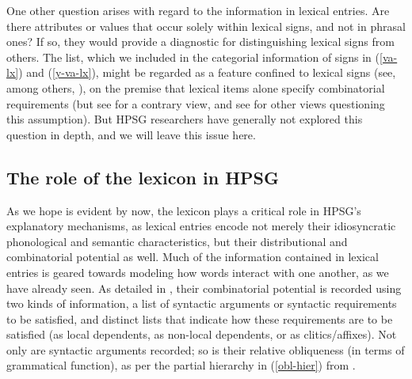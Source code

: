 \documentclass[output=paper,biblatex,babelshorthands,newtxmath,draftmode,colorlinks,citecolor=brown]{langscibook}
\begin{document}
\largerpage
One other question arises with regard to the information in lexical entries.
Are there attributes or values that occur solely within lexical signs, and not in phrasal ones? 
If so, they would provide a diagnostic for distinguishing lexical signs from others.
The  list, which we included in the categorial information of signs in (\ref{va-lx}) and (\ref{y-va-lx}), might be regarded as a feature confined to lexical signs (see, among others, \citealt[361]{GinzburgandSag2001}), on the premise that lexical items alone specify combinatorial requirements (but see \citealt{Przepiorkowski2001} for a contrary view, and see  for other views questioning this assumption).
But HPSG researchers have generally not explored this question in depth, and we will leave this issue here.

\subsection{The role of the lexicon in HPSG}

As we hope is evident by now, the lexicon plays a critical role in HPSG's explanatory mechanisms, as lexical entries encode not merely their idiosyncratic phonological and semantic characteristics, but their distributional and combinatorial potential as well.
Much of the information contained in lexical entries is geared towards modeling how words interact with one another, as we have already seen. 
As detailed in , their combinatorial potential is recorded using two kinds of information, 
a list of syntactic arguments or syntactic requirements to be satisfied, and distinct lists that indicate how these requirements are to be satisfied (as local dependents, as non-local dependents, or as clitics/affixes).
Not only are syntactic arguments recorded; so is their relative obliqueness (in terms of grammatical function), as per the partial hierarchy in (\ref{obl-hier}) from \citet[]{PollardandSag1992}. 
\end{document}
